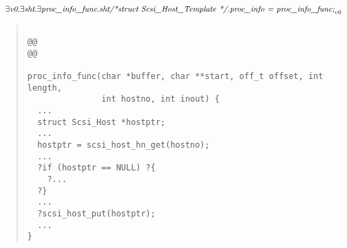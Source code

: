 \documentclass{article}
\newcommand{\mita}[1]{\mbox{\it{{#1}}}}
\begin{document}
\[\begin{array}{l}
\exists \mita{v0} . \exists \mita{sht} . \exists \mita{proc\_info\_func} . \mita{sht/*struct Scsi\_Host\_Template */.proc\_info = proc\_info\_func;}_{v0}
\end{array}\]

\begin{quote}\begin{verbatim}

@@
@@

proc_info_func(char *buffer, char **start, off_t offset, int length,
               int hostno, int inout) {
  ...
  struct Scsi_Host *hostptr;
  ...
  hostptr = scsi_host_hn_get(hostno);
  ...
  ?if (hostptr == NULL) ?{
    ?...
  ?}
  ...
  ?scsi_host_put(hostptr);
  ...
}
\end{verbatim}\end{quote}
\end{document}
